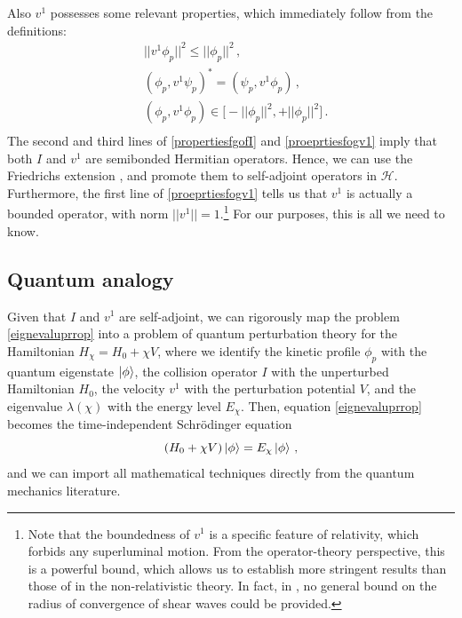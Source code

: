\documentclass[a4paper, amsfonts, amssymb, amsmath, reprint, showkeys, nofootinbib, twoside, onecolumn,notitlepage]{revtex4-2}
\theoremstyle{definition}
\theoremstyle{theorem}
\theoremstyle{corollary}
\begin{document}
Also $v^1$ possesses some relevant properties, which immediately follow from the definitions:
\begin{equation}\label{proeprtiesfogv1}
\begin{split}
& || v^1 \phi_p ||^2 \leq || \phi_p||^2 \, , \\
& (\phi_p,v^1\psi_p)^*=(\psi_p,v^1\phi_p) \, , \\
& (\phi_p,v^1\phi_p) \in \big[-||\phi_p||^2,+||\phi_p||^2 \big] \, . \\
\end{split}
\end{equation}
The second and third lines of \eqref{propertiesfgofI} and \eqref{proeprtiesfogv1} imply that both $I$ and $v^1$ are semibonded Hermitian operators. Hence, we can use the Friedrichs extension \cite{Pedersenbook}, and promote them to self-adjoint operators in $\mathcal{H}$. Furthermore, the first line of \eqref{proeprtiesfogv1} tells us that $v^1$ is actually a bounded operator, with norm $|| v^1||{=}1$.\footnote{Note that the boundedness of $v^1$ is a specific feature of relativity, which forbids any superluminal motion. From the operator-theory perspective, this is a powerful bound, which allows us to establish more stringent results than those of \cite{McLennan1965} in the non-relativistic theory. In fact, in \cite{McLennan1965}, no general bound on the radius of convergence of shear waves could be provided.} For our purposes, this is all we need to know.

\subsection{Quantum analogy}\label{anLuz}

Given that $I$ and $v^1$ are self-adjoint, we can rigorously map the problem \eqref{eignevaluprrop} into a problem of quantum perturbation theory for the Hamiltonian $H_\chi=H_0+\chi V$, where we identify the kinetic profile $\phi_p$ with the quantum eigenstate $\ket{\phi}$, the collision operator $I$ with the unperturbed Hamiltonian $H_0$, the velocity $v^1$ with the perturbation potential $V$, and the eigenvalue $\lambda(\chi)$ with the energy level $E_\chi$. Then, equation \eqref{eignevaluprrop} becomes the time-independent Schr\"{o}dinger equation
\begin{equation}
    (H_0+\chi V)\ket{\phi}=E_\chi\ket{\phi} \, ,
\end{equation}
and we can import all mathematical techniques directly from the quantum mechanics literature. 
\end{document}
